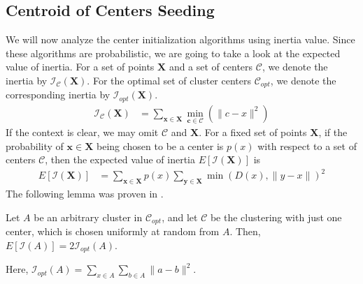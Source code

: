 \documentclass[twoside, 11pt]{article}
\newcommand{\x}{\mathbf{x}}
\newcommand{\X}{\mathbf{X}}
\newcommand{\y}{\mathbf{y}}
\renewcommand{\c}{\mathbf{c}}
\newcommand{\C}{\mathcal{C}}
\newcommand{\I}{\mathcal{I}}
\begin{document}
	\subsection{Centroid of Centers Seeding}
	We will now analyze the center initialization algorithms using inertia value. Since these algorithms are probabilistic, we are going to take a look at the expected value of inertia. For a set of points $\X$ and a set of centers $\C$, we denote the inertia by $\I_\C(\X)$. For the optimal set of cluster centers $\C_{opt}$, we denote the corresponding inertia by $\I_{opt}(\X)$.
		\begin{align*}
			\I_\C(\X) & = \sum_{\x\in\X}\min_{\c\in\C}(\|c-x\|^2)
		\end{align*}
	If the context is clear, we may omit $\C$ and $\X$. For a fixed set of points $\X$, if the probability of $\x\in\X$ being chosen to be a center is $p(x)$ with respect to a set of centers $\C$, then the expected value of inertia $E[\I(\X)]$ is
		\begin{align*}
			E[\I(\X)] & = \sum_{\x\in\X}p(x)\sum_{\y\in\X}\min(D(x),\|y-x\|)^2
		\end{align*}
	The following lemma was proven in \cite[Lemma $3.2$]{kmeans++}.
		\begin{lemma}
			Let $A$ be an arbitrary cluster in $\C_{opt}$, and let $\C$ be the clustering with just one center, which is chosen uniformly at random from $A$. Then, $E[\I(A)]=2\I_{opt}(A)$.
		\end{lemma}
	Here, $\I_{opt}(A)=\sum_{x\in A}\sum_{b\in A}\|a-b\|^2$. 
	
\end{document}
